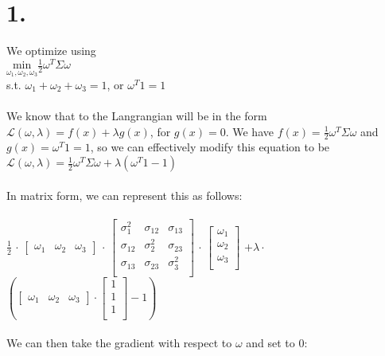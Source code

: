 \documentclass{article}
\begin{document}
\thispagestyle{firstpageheader}

\section*{1.}
{\Large 

We optimize using \\
$\underset{\omega_1, \omega_2, \omega_3}{\text{min}} \frac{1}{2}\omega^T \Sigma \omega$ \\
s.t. $\omega_1 + \omega_2 + \omega_3 = 1$, or $\omega^T 1 = 1$ \\ \\
We know that to the Langrangian will be in the form $\mathcal{L} (\omega, \lambda) = f(x) + \lambda g(x)$, for $g(x) = 0$. We have $f(x) = \frac{1}{2}\omega^T \Sigma \omega$ and $g(x) = \omega^T 1 = 1$, so we can effectively modify this equation to be
$\mathcal{L} (\omega, \lambda) = \frac{1}{2}\omega^T \Sigma \omega + \lambda (\omega^T 1 - 1)$ \\ \\
In matrix form, we can represent this as follows: \\ \\
$\frac{1}{2}$
$\cdot$
$\begin{bmatrix}
  \omega_1 & \omega_2 & \omega_3
\end{bmatrix}$ 
$\cdot$
$\begin{bmatrix}
  \sigma_1^2 & \sigma_{12} & \sigma_{13} \\
  \sigma_{12} & \sigma_2^2 & \sigma_{23} \\
  \sigma_{13} & \sigma_{23} & \sigma_3^2 \\
\end{bmatrix}$
$\cdot$
$\begin{bmatrix}
  \omega_1 \\
  \omega_2 \\
  \omega_3 \\
\end{bmatrix}$ 
$+ \lambda \cdot$ 
$(\begin{bmatrix}
  \omega_1 & \omega_2 & \omega_3
\end{bmatrix}
\cdot 
\begin{bmatrix}
  1 \\
  1 \\
  1 \\
\end{bmatrix}
- 1)$ \\ \\
We can then take the gradient with respect to $\omega$ and set to 0: \\ \\
}
\end{document}
